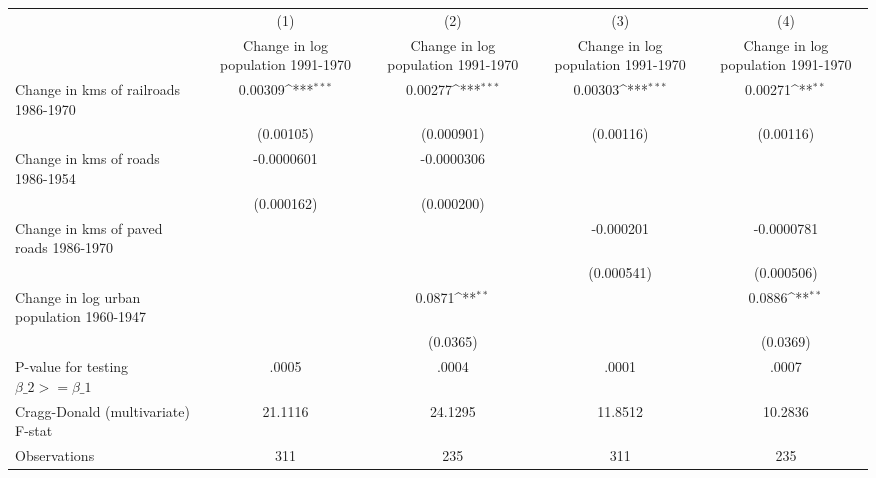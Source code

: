 {
\def\sym#1{\ifmmode^{#1}\else\(^{#1}\)\fi}
\begin{tabular}{l*{4}{c}}
\hline\hline
                &\multicolumn{1}{c}{(1)}&\multicolumn{1}{c}{(2)}&\multicolumn{1}{c}{(3)}&\multicolumn{1}{c}{(4)}\\
                &\multicolumn{1}{c}{Change in log population 1991-1970}&\multicolumn{1}{c}{Change in log population 1991-1970}&\multicolumn{1}{c}{Change in log population 1991-1970}&\multicolumn{1}{c}{Change in log population 1991-1970}\\
\hline
Change in kms of railroads 1986-1970&  0.00309\sym{***}&  0.00277\sym{***}&  0.00303\sym{***}&  0.00271\sym{**} \\
                &(0.00105)         &(0.000901)         &(0.00116)         &(0.00116)         \\
[1em]
Change in kms of roads 1986-1954&-0.0000601         &-0.0000306         &                  &                  \\
                &(0.000162)         &(0.000200)         &                  &                  \\
[1em]
Change in kms of paved roads 1986-1970&                  &                  &-0.000201         &-0.0000781         \\
                &                  &                  &(0.000541)         &(0.000506)         \\
[1em]
Change in log urban population 1960-1947&                  &   0.0871\sym{**} &                  &   0.0886\sym{**} \\
                &                  & (0.0365)         &                  & (0.0369)         \\
\hline
P-value for testing $\beta\_{2} >= \beta\_{1}$&    .0005         &    .0004         &    .0001         &    .0007         \\
Cragg-Donald (multivariate) F-stat&  21.1116         &  24.1295         &  11.8512         &  10.2836         \\
Observations    &      311         &      235         &      311         &      235         \\
\hline\hline
\end{tabular}
}
